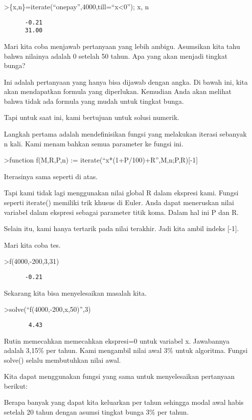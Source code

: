\documentclass[
]{book}
\begin{document}
\textgreater\{x,n\}=iterate(``onepay'',4000,till=``x\textless0''); x, n

\begin{verbatim}
      -0.21 
      31.00 
\end{verbatim}

Mari kita coba menjawab pertanyaan yang lebih ambigu. Asumsikan kita tahu bahwa nilainya adalah 0 setelah 50 tahun. Apa yang akan menjadi tingkat bunga?

Ini adalah pertanyaan yang hanya bisa dijawab dengan angka. Di bawah ini, kita akan mendapatkan formula yang diperlukan. Kemudian Anda akan melihat bahwa tidak ada formula yang mudah untuk tingkat bunga.

Tapi untuk saat ini, kami bertujuan untuk solusi numerik.

Langkah pertama adalah mendefinisikan fungsi yang melakukan iterasi sebanyak n kali. Kami menambahkan semua parameter ke fungsi ini.

\textgreater function f(M,R,P,n) := iterate(``x*(1+P/100)+R'',M,n;P,R){[}-1{]}

Iterasinya sama seperti di atas.

Tapi kami tidak lagi menggunakan nilai global R dalam ekspresi kami. Fungsi seperti iterate() memiliki trik khusus di Euler. Anda dapat meneruskan nilai variabel dalam ekspresi sebagai parameter titik koma. Dalam hal ini P dan R.

Selain itu, kami hanya tertarik pada nilai terakhir. Jadi kita ambil indeks {[}-1{]}.

Mari kita coba tes.

\textgreater f(4000,-200,3,31)

\begin{verbatim}
      -0.21 
\end{verbatim}

Sekarang kita bisa menyelesaikan masalah kita.

\textgreater solve(``f(4000,-200,x,50)'',3)

\begin{verbatim}
       4.43 
\end{verbatim}

Rutin memecahkan memecahkan ekspresi=0 untuk variabel x. Jawabannya adalah 3,15\% per tahun. Kami mengambil nilai awal 3\% untuk algoritma. Fungsi solve() selalu membutuhkan nilai awal.

Kita dapat menggunakan fungsi yang sama untuk menyelesaikan pertanyaan berikut:

Berapa banyak yang dapat kita keluarkan per tahun sehingga modal awal habis setelah 20 tahun dengan asumsi tingkat bunga 3\% per tahun.
\end{document}
